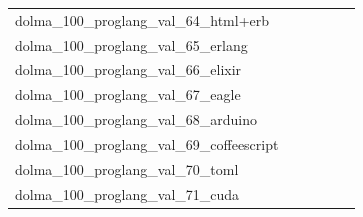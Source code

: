 \documentclass[dvipsnames]{article}
\begin{document}
\begin{appendix}
{\begin{longtable}{m{6cm}m{1.7cm}m{1.7cm}m{1.7cm}m{1.7cm}m{1.7cm}}
	dolma\_100\_proglang\_val\_64\_html+erb  & \colorbox[HTML]{eaf7af}{\makebox[\mywidth][c]{2.10}} & \colorbox[HTML]{e1f3a9}{\makebox[\mywidth][c]{2.09}} & \colorbox[HTML]{ffffe5}{\makebox[\mywidth][c]{2.23}} & \colorbox[HTML]{b3df91}{\makebox[\mywidth][c]{2.08}} & \colorbox[HTML]{77c578}{\makebox[\mywidth][c]{2.07}}\\
	dolma\_100\_proglang\_val\_65\_erlang  & \colorbox[HTML]{77c578}{\makebox[\mywidth][c]{2.84}} & \colorbox[HTML]{dcf1a5}{\makebox[\mywidth][c]{2.98}} & \colorbox[HTML]{ffffe5}{\makebox[\mywidth][c]{3.87}} & \colorbox[HTML]{a2d889}{\makebox[\mywidth][c]{2.88}} & \colorbox[HTML]{82ca7d}{\makebox[\mywidth][c]{2.85}}\\
	dolma\_100\_proglang\_val\_66\_elixir  & \colorbox[HTML]{9fd688}{\makebox[\mywidth][c]{2.93}} & \colorbox[HTML]{d8efa2}{\makebox[\mywidth][c]{2.99}} & \colorbox[HTML]{ffffe5}{\makebox[\mywidth][c]{3.58}} & \colorbox[HTML]{87cc7f}{\makebox[\mywidth][c]{2.91}} & \colorbox[HTML]{77c578}{\makebox[\mywidth][c]{2.90}}\\
	dolma\_100\_proglang\_val\_67\_eagle  & \colorbox[HTML]{77c578}{\makebox[\mywidth][c]{5.35}} & \colorbox[HTML]{f9fcc5}{\makebox[\mywidth][c]{6.90}} & \colorbox[HTML]{ffffe5}{\makebox[\mywidth][c]{10.75}} & \colorbox[HTML]{acdc8d}{\makebox[\mywidth][c]{5.64}} & \colorbox[HTML]{bbe395}{\makebox[\mywidth][c]{5.76}}\\
	dolma\_100\_proglang\_val\_68\_arduino  & \colorbox[HTML]{e7f5ad}{\makebox[\mywidth][c]{3.37}} & \colorbox[HTML]{f5fbb8}{\makebox[\mywidth][c]{3.40}} & \colorbox[HTML]{ffffe5}{\makebox[\mywidth][c]{3.81}} & \colorbox[HTML]{7fc97b}{\makebox[\mywidth][c]{3.28}} & \colorbox[HTML]{77c578}{\makebox[\mywidth][c]{3.28}}\\
	dolma\_100\_proglang\_val\_69\_coffeescript  & \colorbox[HTML]{afdd8f}{\makebox[\mywidth][c]{2.80}} & \colorbox[HTML]{e5f4ab}{\makebox[\mywidth][c]{2.85}} & \colorbox[HTML]{ffffe5}{\makebox[\mywidth][c]{3.27}} & \colorbox[HTML]{b6e092}{\makebox[\mywidth][c]{2.80}} & \colorbox[HTML]{77c578}{\makebox[\mywidth][c]{2.77}}\\
	dolma\_100\_proglang\_val\_70\_toml  & \colorbox[HTML]{f7fcbb}{\makebox[\mywidth][c]{7.76}} & \colorbox[HTML]{c5e799}{\makebox[\mywidth][c]{7.62}} & \colorbox[HTML]{ffffe5}{\makebox[\mywidth][c]{8.44}} & \colorbox[HTML]{77c578}{\makebox[\mywidth][c]{7.53}} & \colorbox[HTML]{a7da8b}{\makebox[\mywidth][c]{7.58}}\\
	dolma\_100\_proglang\_val\_71\_cuda  & \colorbox[HTML]{77c578}{\makebox[\mywidth][c]{2.15}} & \colorbox[HTML]{e5f4ab}{\makebox[\mywidth][c]{2.21}} & \colorbox[HTML]{ffffe5}{\makebox[\mywidth][c]{2.56}} & \colorbox[HTML]{c6e89a}{\makebox[\mywidth][c]{2.19}} & \colorbox[HTML]{9bd587}{\makebox[\mywidth][c]{2.16}}\\

\end{longtable}}
\end{appendix}
\end{document}
